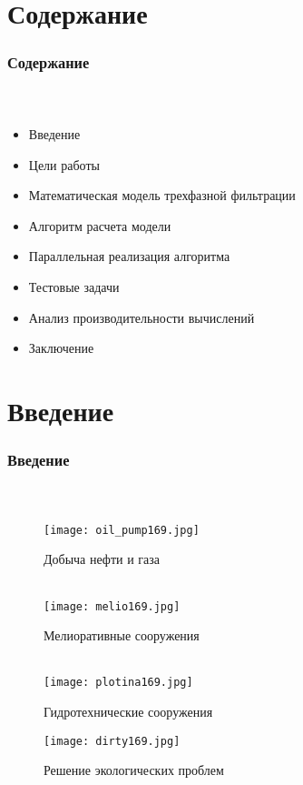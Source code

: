 \section{Содержание}

\begin{frame}
\begin{center}
\frametitle{Содержание}
\framesubtitle{\ }
\begin{itemize}
\item {\large Введение}
\vspace{0.3cm}
\item {\large Цели работы}
\vspace{0.3cm}
\item {\large Математическая модель трехфазной фильтрации}
\vspace{0.3cm}
\item {\large Алгоритм расчета модели}
\vspace{0.3cm}
\item {\large Параллельная реализация алгоритма}
\vspace{0.3cm}
\item {\large Тестовые задачи}
\vspace{0.3cm}
\item {\large Анализ производительности вычислений}
\vspace{0.3cm}
\item {\large Заключение}
\end{itemize}
\end{center}
\end{frame}

\section{Введение}

\begin{frame}
\begin{center}
\frametitle{Введение}
\framesubtitle{\ }
\begin{figure}
\begin{minipage}[h]{0.43\textwidth}
\texttt{[image: oil\_pump169.jpg]}
\caption{\small{Добыча нефти и газа\\ \ }}
\end{minipage}
\hspace{8mm}
\begin{minipage}[h]{0.43\textwidth}
\texttt{[image: melio169.jpg]}
\caption{\small{Мелиоративные сооружения\\ \ }}
\end{minipage}
\vfill
\begin{minipage}[h]{0.43\textwidth}
\texttt{[image: plotina169.jpg]}
\caption{\small{Гидротехнические сооружения}}
\end{minipage}
\hspace{8mm}
\begin{minipage}[h]{0.43\textwidth}
\texttt{[image: dirty169.jpg]}
\caption{\small{Решение экологических проблем}}
\end{minipage}
\end{figure}
\end{center}
\end{frame}

